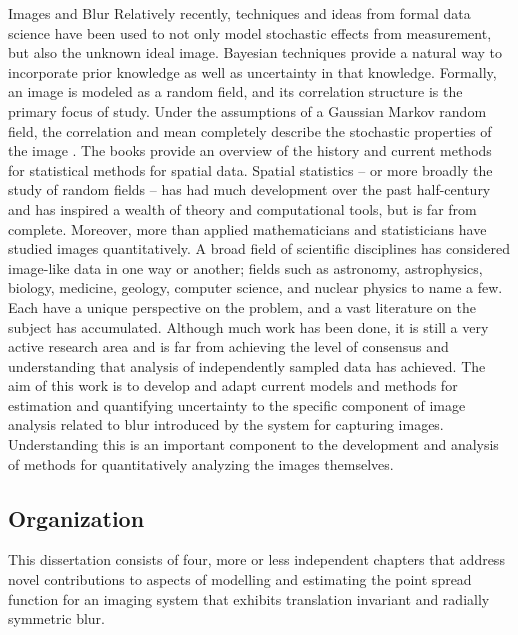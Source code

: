 \begin{chapter}{Images and Blur}
Relatively recently, techniques and ideas from formal data science have been used to not only model stochastic effects from measurement, but also the unknown ideal image. 
Bayesian techniques provide a natural way to incorporate prior knowledge as well as uncertainty in that knowledge.
Formally, an image is modeled as a random field, and its correlation structure is the primary focus of study.
Under the assumptions of a Gaussian Markov random field, the correlation and mean completely describe the stochastic properties of the image \citep{rue2005gaussian}.
The books \citep{cressie1993statistics,rue2005gaussian} provide an overview of the history and current methods for statistical methods for spatial data.
Spatial statistics -- or more broadly the study of random fields -- has had much development over the past half-century and has inspired a wealth of theory and computational tools, but is far from complete.
Moreover, more than applied mathematicians and statisticians have studied images quantitatively.
  A broad field of scientific disciplines has considered image-like data in one way or another; fields such as astronomy, astrophysics, biology, medicine, geology, computer science, and nuclear physics to name a few.
Each have a unique perspective on the problem, and a vast literature on the subject has accumulated.
Although much work has been done, it is still a very active research area and is far from achieving the level of consensus and understanding that analysis of independently sampled data has achieved. 
The aim of this work is to develop and adapt current models and methods for estimation and quantifying uncertainty to the specific component of image analysis related to blur introduced by the system for capturing images.
Understanding this is an important component to the development and analysis of methods for quantitatively analyzing the images themselves.

\subsection{Organization}
This dissertation consists of four, more or less independent chapters that address novel contributions to aspects of modelling and estimating the point spread function for an imaging system that exhibits translation invariant and radially symmetric blur.


\end{chapter}
